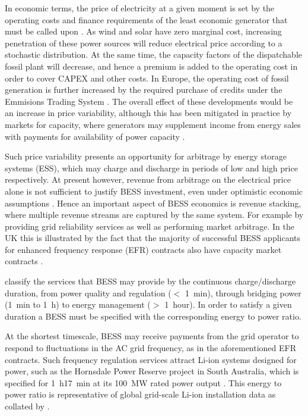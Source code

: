\documentclass[preprint,3p,review,authoryear,10pt]{elsarticle}
\begin{document}
In economic terms, the price of electricity at a given moment is set by the operating costs and finance requirements of the least economic generator that must be called upon \cite{Staffell2016}. As wind and solar have zero marginal cost, increasing penetration of these power sources will reduce electrical price according to a stochastic distribution. At the same time, the capacity factors of the dispatchable fossil plant will decrease, and hence a premium is added to the operating cost in order to cover CAPEX and other costs. In Europe, the operating cost of fossil generation is further increased by the required purchase of credits under the Emmisions Trading System \cite{Staffell2018}. The overall effect of these developments would be an increase in price variability, although this has been mitigated in practice by markets for capacity, where generators may supplement income from energy sales with payments for availability of power capacity \cite{ENGIE}.

Such price variability presents an opportunity for arbitrage by energy storage systems (ESS), which may charge and discharge in periods of low and high price respectively. At present however, revenue from arbitrage on the electrical price alone is not sufficient to justify BESS investment, even under optimistic economic assumptions \cite{Hu2010}. Hence an important aspect of BESS economics is revenue stacking, where multiple revenue streams are captured by the same system. For example by providing grid reliability services as well as performing market arbitrage. In the UK this is illustrated by the fact that the majority of successful BESS applicants for enhanced frequency response (EFR) contracts also have capacity market contracts \cite{NGDeratingFactors}.

\cite{Sabihuddin2015} classify the services that BESS may provide by the continuous charge/discharge duration, from power quality and regulation ($<$ \SI{1}{\minute}), through bridging power (\SI{1}{\minute} to \SI{1}{\hour}) to energy management ($>$ \SI{1}{hour}). In order to satisfy a given duration a BESS must be specified with the corresponding energy to power ratio.

At the shortest timescale, BESS may receive payments from the grid operator to respond to fluctuations in the AC grid frequency, as in the aforementioned EFR contracts. Such frequency regulation services attract Li-ion systems designed for power, such as the Hornsdale Power Reserve project in South Australia, which is specified for \SI{1}{\hour}\SI{17}{\minute} at its \SI{100}{\mega\watt} rated power output \cite{DOEGlobalESSDatabase}. This energy to power ratio is representative of global grid-scale Li-ion installation data as collated by \cite{Newbery2018}.
\end{document}
